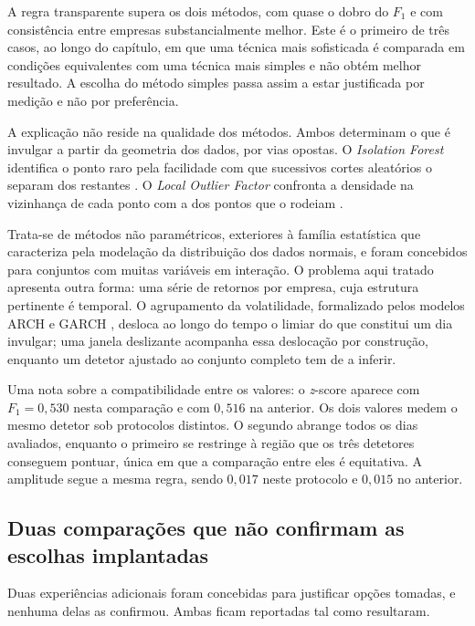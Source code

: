 A regra transparente supera os dois métodos, com quase o dobro do $F_1$ e com consistência entre
empresas substancialmente melhor. Este é o primeiro de três casos, ao longo do capítulo, em que uma
técnica mais sofisticada é comparada em condições equivalentes com uma técnica mais simples e não
obtém melhor resultado. A escolha do método simples passa assim a estar justificada por medição e
não por preferência.

A explicação não reside na qualidade dos métodos. Ambos determinam o que é invulgar a partir da geometria dos dados, por vias opostas. O
\emph{Isolation Forest} identifica o ponto raro pela facilidade com que sucessivos cortes
aleatórios o separam dos restantes \autocite{liu2008isolation}. O \emph{Local Outlier Factor}
confronta a densidade na vizinhança de cada ponto com a dos pontos que o rodeiam
\autocite{breunig2000lof}.

Trata-se de
métodos não paramétricos, exteriores à família estatística que \textcite{chandola2009anomaly}
caracteriza pela modelação da distribuição dos dados normais, e foram concebidos para conjuntos com
muitas variáveis em interação. O problema aqui tratado apresenta outra forma: uma série de retornos
por empresa, cuja estrutura pertinente é temporal. O agrupamento da volatilidade, formalizado pelos
modelos \gls{ARCH} e \gls{GARCH} \autocite{engle1982arch, bollerslev1986garch}, desloca ao longo do
tempo o limiar do que constitui um dia invulgar; uma janela deslizante acompanha essa deslocação
por construção, enquanto um detetor ajustado ao conjunto completo tem de a inferir.

Uma nota sobre a compatibilidade entre os valores: o \emph{z}-score aparece com $F_1 = 0{,}530$ nesta
comparação e com $0{,}516$ na anterior. Os dois valores medem o mesmo detetor sob protocolos
distintos. O segundo abrange todos os dias avaliados, enquanto o primeiro se restringe à região que
os três detetores conseguem pontuar, única em que a comparação entre eles é equitativa. A amplitude
segue a mesma regra, sendo $0{,}017$ neste protocolo e $0{,}015$ no anterior.

\subsection{Duas comparações que não confirmam as escolhas implantadas}

Duas experiências adicionais foram concebidas para justificar opções tomadas, e nenhuma delas as
confirmou. Ambas ficam reportadas tal como resultaram.

